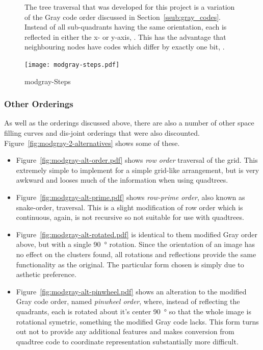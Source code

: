 \begin{figure}[tbhp]
\begin{subfigure}[c]{4.6cm}
		\caption{}\label{fig:modgray-2-levels-numbers.pdf}
	\end{subfigure}
	\caption{The tree traversal that was developed for this project is a
		variation of the Gray code order discussed in
		Section~\ref{ssub:gray_codes}.  Instead of all sub-quadrants having the
		same orientation, each is reflected in either the x- or y-axis,
		. This has the advantage that
		neighbouring nodes have codes which differ by exactly one bit,
		.} \label{fig:modgray-traversal}
\end{figure}

\begin{figure}[tbhp]
	\centering
	\texttt{[image: modgray-steps.pdf]}
	\caption{modgray-Steps}
	\label{fig:modgray-steps}
\end{figure}

\subsubsection{Other Orderings}
\label{ssub:other_orderings}

As well as the orderings discussed above, there are also a number of other
space filling curves and dis-joint orderings that were also discounted.
Figure~\ref{fig:modgray-2-alternatives} shows some of these.

\begin{itemize}

	\item Figure~\ref{fig:modgray-alt-order.pdf} shows \emph{row order}
		traversal of the grid. This extremely simple to implement for a simple
		grid-like arrangement, but is very awkward and looses much of the
		information when using quadtrees.

	\item Figure~\ref{fig:modgray-alt-prime.pdf} shows \emph{row-prime order},
		also known as snake-order\cite{goodchild1983optimizing}, traversal.
		This is a slight modification of row order which is continuous, again,
		is not recursive so not suitable for use with quadtrees.

	\item Figure~\ref{fig:modgray-alt-rotated.pdf} is identical to them
		modified Gray order above, but with a single \SI{90}{\degree} rotation.
		Since the orientation of an image has no effect on the clusters found,
		all rotations and reflections provide the same functionality as the
		original. The particular form chosen is simply due to asthetic
		preference.

	\item Figure~\ref{fig:modgray-alt-pinwheel.pdf} shows an alteration to the
		modified Gray code order, named \emph{pinwheel order}, where, instead of
		reflecting the quadrants, each is rotated about it's center
		\SI{90}{\degree} so that the whole image is rotational symetric,
		something the modified Gray code lacks.  This form turns out not to
		provide any additional features and makes conversion from quadtree code
		to coordinate representation substantially more difficult.

\end{itemize}

